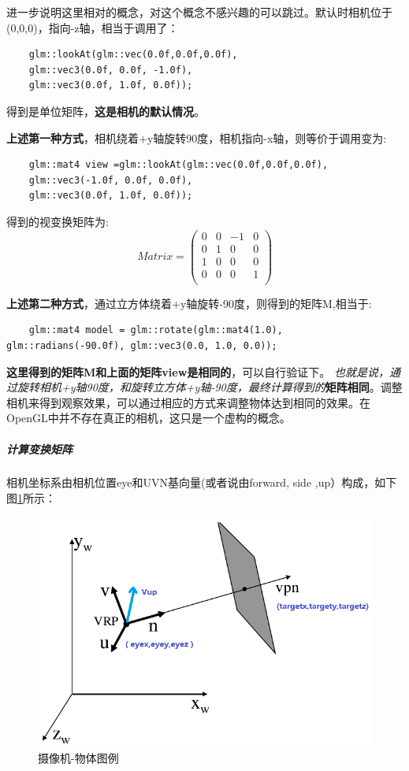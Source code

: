 \documentclass[UTF8,a4paper,12pt]{ctexbook}
\begin{document}
			进一步说明这里相对的概念，对这个概念不感兴趣的可以跳过。默认时相机位于(0,0,0)，指向-z轴，相当于调用了：
			\begin{lstlisting}
	glm::lookAt(glm::vec(0.0f,0.0f,0.0f),
	glm::vec3(0.0f, 0.0f, -1.0f),
	glm::vec3(0.0f, 1.0f, 0.0f));
			\end{lstlisting}
			得到是单位矩阵，\textbf{这是相机的默认情况}。
			
			\textbf{上述第一种方式}，相机绕着+y轴旋转90度，相机指向-x轴，则等价于调用变为:
			\begin{lstlisting}
	glm::mat4 view =glm::lookAt(glm::vec(0.0f,0.0f,0.0f),
	glm::vec3(-1.0f, 0.0f, 0.0f),
	glm::vec3(0.0f, 1.0f, 0.0f));
			\end{lstlisting}
			得到的视变换矩阵为:
				$$
				Matrix = 
				\left(
				\begin{array}{cccc}
				0 & 0 & -1& 0\\
				
				0 & 1 & 0& 0\\
				
				1 & 0 & 0& 0\\
				
				0 & 0 & 0& 1\\
				\end{array}
				\right)
				$$
			
			\textbf{上述第二种方式}，通过立方体绕着+y轴旋转-90度，则得到的矩阵M,相当于:
				\begin{lstlisting}
	glm::mat4 model = glm::rotate(glm::mat4(1.0), glm::radians(-90.0f), glm::vec3(0.0, 1.0, 0.0));
				\end{lstlisting}
				
			\textbf{这里得到的矩阵M和上面的矩阵view是相同的}，可以自行验证下。 
			\textit{也就是说，通过旋转相机+y轴90度，和旋转立方体+y轴-90度，最终计算得到的}\textbf{矩阵相同}。调整相机来得到观察效果，可以通过相应的方式来调整物体达到相同的效果。在OpenGL中并不存在真正的相机，这只是一个虚构的概念。
			
			\subparagraph{计算变换矩阵}
				相机坐标系由相机位置eye和UVN基向量(或者说由forward, side ,up）构成，如下图\ref{shexiang}所示：
				\begin{figure}[H]
					\centering
					\includegraphics[width=.8\linewidth]{EyeTrans.png}
					\caption{摄像机-物体图例}
					\label{shexiang}
				\end{figure}
				
\end{document}
